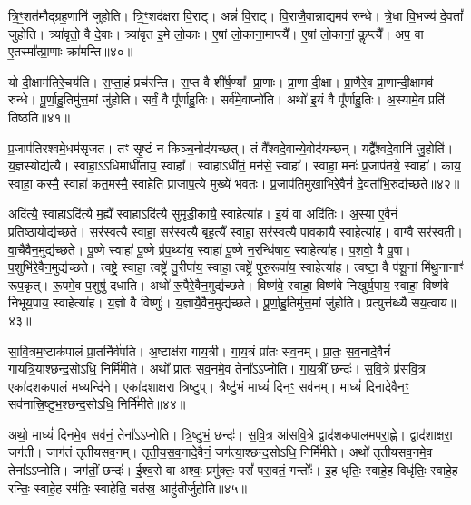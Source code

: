 त्रि॒ꣳ॒शत॑मौद्ग्रह॒णानि॑ जुहोति।
त्रि॒ꣳ॒शद॑क्षरा वि॒राट्।
अन्नं॑ वि॒राट्।
वि॒राजै॒वान्नाद्य॒मव॑ रुन्धे।
त्रे॒धा वि॒भज्य॑ दे॒वतां᳚ जुहोति।
त्र्या॑वृतो॒ वै दे॒वाः।
त्र्या॑वृत इ॒मे लो॒काः।
ए॒षां लो॒काना॒माप्त्यै᳚।
ए॒षां लो॒कानां॒ कॢप्त्यै᳚।
अप॒ वा ए॒तस्मा᳚त्प्रा॒णाः क्रा॑मन्ति॥४०॥

यो दी॒क्षाम॑तिरे॒चय॑ति।
स॒प्ता॒हं प्रच॑रन्ति।
स॒प्त वै शी॑र्\mbox{}ष॒ण्या᳚ प्रा॒णाः।
प्रा॒णा दी॒क्षा।
प्रा॒णैरे॒व प्रा॒णान्दी॒क्षामव॑ रुन्धे।
पू॒र्णा॒हु॒तिमु॑त्त॒मां जु॑होति।
सर्वं॒ वै पू᳚र्णाहु॒तिः।
सर्व॑\-मे॒वा\-प्नो॑ति।
अथो॑ इ॒यं वै पू᳚र्णाहु॒तिः।
अ॒स्यामे॒व प्रति॑ तिष्ठति॥४१॥\anuvakamend[रु॒न्धे॒ प्रा॒णान्दी॒क्षामव॑ रुन्ध उच्यते क्रामन्ति तिष्ठति]

प्र॒जाप॑तिरश्वमे॒धम॑सृजत।
तꣳ सृ॒ष्टं न किञ्च॒नोद॑यच्छत्।
तं वै᳚श्वदे॒वान्ये॒वोद॑यच्छन्।
यद्वै᳚श्वदे॒वानि॑ जु॒होति॑।
य॒ज्ञस्योद्य॑त्यै।
स्वाहा॒\-ऽऽधिमाधी॑ताय॒ स्वाहा᳚।
स्वाहा\-ऽधी॑तं॒ मन॑से॒ स्वाहा᳚।
स्वाहा॒ मनः॑ प्र॒जाप॑तये॒ स्वाहा᳚।
काय॒ स्वाहा॒ कस्मै॒ स्वाहा॑ कत॒मस्मै॒ स्वाहेति॑ प्राजाप॒त्ये मुख्ये॑ भवतः।
प्र॒जाप॑तिमुखाभिरे॒वैनं॑ दे॒वता॑भि॒रुद्य॑च्छते॥४२॥

अदि॑त्यै॒ स्वाहा\-ऽदि॑त्यै म॒ह्यै᳚ स्वाहा\-ऽदि॑त्यै सुमृडी॒कायै॒ स्वाहेत्या॑ह।
इ॒यं वा अदि॑तिः।
अ॒स्या ए॒वैनं॑ प्रति॒ष्ठायोद्य॑च्छते।
सर॑स्वत्यै॒ स्वाहा॒ सर॑स्वत्यै बृह॒त्यै᳚ स्वाहा॒ सर॑स्वत्यै पाव॒कायै॒ स्वाहेत्या॑ह।
वाग्वै सर॑स्वती।
वा॒चैवैन॒मुद्य॑च्छते।
पू॒ष्णे स्वाहा॑ पू॒ष्णे प्र॑प॒थ्या॑य॒ स्वाहा॑ पू॒ष्णे न॒रन्धि॑षाय॒ स्वाहेत्या॑ह।
प॒शवो॒ वै पू॒षा।
प॒शुभि॑रे॒वैन॒मुद्य॑च्छते।
त्वष्ट्रे॒ स्वाहा॒ त्वष्ट्रे॑ तु॒रीपा॑य॒ स्वाहा॒ त्वष्ट्रे॑ पुरु॒रूपा॑य॒ स्वाहेत्या॑ह।
त्वष्टा॒ वै प॑शू॒नां मि॑थु॒नानाꣳ॑ रूप॒कृत्।
रू॒पमे॒व प॒शुषु॑ दधाति।
अथो॑ रू॒पैरे॒वैन॒मुद्य॑च्छते।
विष्ण॑वे॒ स्वाहा॒ विष्ण॑वे निखुर्य॒पाय॒ स्वाहा॒ विष्ण॑वे निभूय॒पाय॒ स्वाहेत्या॑ह।
य॒ज्ञो वै विष्णुः॑।
य॒ज्ञायै॒वैन॒मुद्य॑च्छते।
पू॒र्णा॒हु॒तिमु॑त्त॒मां जु॑होति।
प्रत्युत्त॑ब्ध्यै सय॒त्वाय॑॥४३॥\anuvakamend[य॒च्छ॒ते॒ पु॒रु॒रूपा॑य॒ स्वाहेत्या॑हा॒ष्टौ च॑]

सा॒वि॒त्रम॒ष्टाक॑पालं प्रा॒तर्निर्व॑पति।
अ॒ष्टाक्ष॑रा गाय॒त्री।
गा॒य॒त्रं प्रा॑तः सव॒नम्।
प्रा॒तः॒ स॒व॒नादे॒वैनं॑ गायत्रि॒याश्छन्द॒सो\-ऽधि॒ निर्मि॑मीते।
अथो᳚ प्रातः सव॒नमे॒व तेना᳚ऽऽप्नोति।
गा॒य॒त्रीं छन्दः॑।
स॒वि॒त्रे प्र॑सवि॒त्र एका॑दशकपालं म॒ध्यन्दि॑ने।
एका॑दशाक्षरा त्रि॒ष्टुप्।
त्रैष्टु॑भं॒ माध्यं॑ दिन॒ꣳ॒ सव॑नम्।
माध्यं॑ दिनादे॒वैन॒ꣳ॒ सव॑नात्त्रि॒ष्टुभ॒श्छन्द॒सोऽधि॒ निर्मि॑मीते॥४४॥

अथो॒ माध्यं॑ दिनमे॒व सव॑नं॒ तेना᳚ऽऽप्नोति।
त्रि॒ष्टुभं॒ छन्दः॑।
स॒वि॒त्र आ॑सवि॒त्रे द्वाद॑शकपालमपरा॒ह्णे।
द्वाद॑शाक्षरा॒ जग॑ती।
जाग॑तं तृतीयसव॒नम्।
तृ॒ती॒य॒स॒व॒नादे॒वैनं॒ जग॑त्या॒श्छन्द॒सोऽधि॒ निर्मि॑मीते।
अथो॑ तृतीयसव॒नमे॒व तेना᳚ऽऽप्नोति।
जग॑तीं॒ छन्दः॑।
ई॒श्व॒रो वा अश्वः॒ प्रमु॑क्तः॒ परां᳚ परा॒वतं॒ गन्तोः᳚।
इ॒ह धृतिः॒ स्वाहे॒ह विधृ॑तिः॒ स्वाहे॒ह रन्तिः॒ स्वाहे॒ह रम॑तिः॒ स्वाहेति॒ चत॑स्र॒ आहु॑तीर्जुहोति॥४५॥

